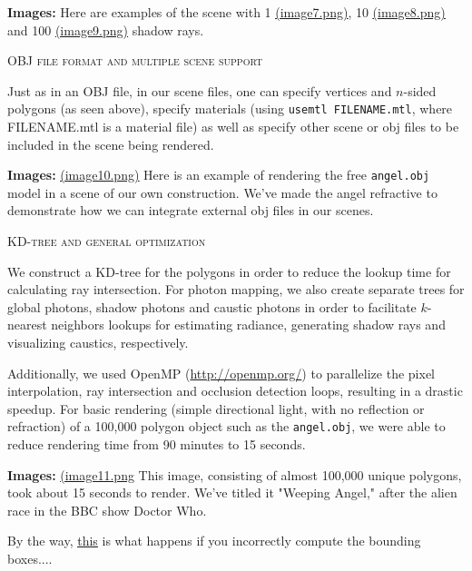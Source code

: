\documentclass{article}
\begin{document}
\vspace{3mm}
{\bf Images:} Here are examples of the scene with 1 \href{run://images/image7.png}{\underline{(image7.png)}}, 10 \href{run://images/image8.png}{\underline{(image8.png)}} and 100 \href{run://images/image9.png}{\underline{(image9.png)}} shadow rays.

\begin{center}\textsc{OBJ file format and multiple scene support}\end{center} 
Just as in an OBJ file, in our scene files, one can specify vertices and $n$-sided polygons (as seen above), specify materials (using \verb+usemtl FILENAME.mtl+, where FILENAME.mtl is a material file) as well as specify other scene or obj files to be included in the scene being rendered.

\vspace{3mm}
{\bf Images:} \href{run://images/image10.png}{\underline{(image10.png)}} Here is an example of rendering the free \verb+angel.obj+ model in a scene of our own construction. We've made the angel refractive to demonstrate how we can integrate external obj files in our scenes.

\begin{center}\textsc{KD-tree and general optimization}\end{center} 
We construct a KD-tree for the polygons in order to reduce the lookup time for calculating ray intersection. For photon mapping, we also create separate trees for global photons, shadow photons and caustic photons in order to facilitate $k$-nearest neighbors lookups for estimating radiance, generating shadow rays and visualizing caustics, respectively.

Additionally, we used OpenMP (\url{http://openmp.org/}) to parallelize the pixel interpolation, ray intersection and occlusion detection loops, resulting in a drastic speedup. For basic rendering (simple directional light, with no reflection or refraction) of a 100,000 polygon object such as the \verb+angel.obj+, we were able to reduce rendering time from 90 minutes to 15 seconds.

\vspace{3mm}
{\bf Images:} \href{run://images/image11.png}{\underline{(image11.png}} This image, consisting of almost 100,000 unique polygons, took about 15 seconds to render. We've titled it "Weeping Angel," after the alien race in the BBC show Doctor Who.

By the way, \href{run://images/duude.png}{\underline{this}} is what happens if you incorrectly compute the bounding boxes....
\end{document}
